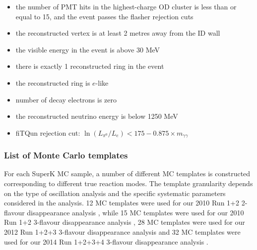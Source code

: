 \begin{itemize}
\item
the number of PMT hits in the highest-charge OD cluster is less than or
equal to 15, and the event passes the flasher rejection cuts
\item
the reconstructed vertex is at least 2 metres away from the ID wall 
\item
the visible energy in the event is above 30 MeV 
\item
there is exactly 1 reconstructed ring in the event 
\item
the reconstructed ring is $e$-like 
\item
number of decay electrons is zero
\item
the reconstructed neutrino energy is below 1250 MeV
\item
fiTQun rejection cut: $\ln (L_{\pi^0} / L_e ) < 175 - 0.875 \times m_{\gamma \gamma} $
\end{itemize}

\subsubsection {List of Monte Carlo templates}
\label{sec:mc_templates:template_list}

For each SuperK MC sample, a number of different MC templates is constructed 
corresponding to different true reaction modes.
The template granularity depends on the type of oscillation analysis and the specific 
systematic parameters considered in the analysis.
12 MC templates were used for our 2010 Run 1+2 2-flavour disappearance analysis \cite{OurRun12DisappAnalysis}, while
15 MC templates were used for our 2010 Run 1+2 3-flavour disappearance analysis \cite{OurRun12DisappAnalysis3Flavour},
28 MC templates were used for our 2012 Run 1+2+3 3-flavour disappearance analysis \cite{OurRun123DisappAnalysis3Flavour} and
32 MC templates were used for our 2014 Run 1+2+3+4 3-flavour disappearance analysis \cite{OurRun1234DisappAnalysis3Flavour}.

